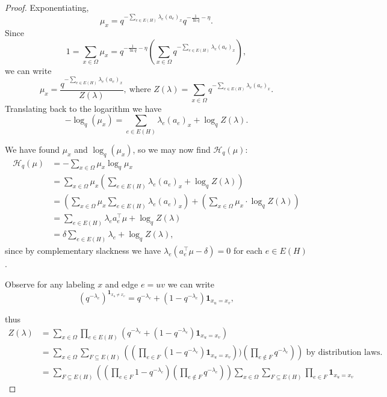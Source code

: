\documentclass[10pt,a4paper]{amsart}
\begin{document}
\begin{proof}
\noindent Exponentiating,
\[
\mu_x=q^{-\sum_{e\in E(H)}\lambda_e(a_e)_x}q^{-\frac{1}{\ln q}-\eta}.
\]
Since 
\[
1=\sum_{x\in\Omega}\mu_x=q^{-\frac{1}{\ln q}-\eta}\left(\sum_{x\in\Omega}q^{-\sum_{e\in E(H)}\lambda_e(a_e)_x}\right),
\]
we can write 
\[
\mu_x=\frac{q^{-\sum_{e\in E(H)}\lambda_e(a_e)_x}}{Z(\lambda)},\ \text{where }Z(\lambda)=\sum_{x\in\Omega}q^{-\sum_{e\in E(H)}\lambda_e(a_e)_x}.
\]
Translating back to the logarithm we have
\[
-\log_q(\mu_x)=\sum_{e\in E(H)}\lambda_e(a_e)_x+\log_qZ(\lambda).
\]

We have found $\mu_x$ and $\log_q(\mu_x)$, so we may now find $\mathcal H_{q}(\mu)$:
\begin{align*}
    \mathcal H_{q}(\mu)&=-\sum_{x\in\Omega}\mu_x\log_q\mu_x\\
    &=\sum_{x\in\Omega}\mu_x\left(\sum_{e\in E(H)}\lambda_e(a_e)_x+\log_qZ(\lambda)\right)\\
    &=\left(\sum_{x\in\Omega}\mu_x\sum_{e\in E(H)}\lambda_e(a_e)_x\right)+\left(\sum_{x\in\Omega}\mu_x\cdot\log_q Z(\lambda)\right)\\
    &=\sum_{e\in E(H)}\lambda_ea_e^\top\mu+\log_qZ(\lambda)\\
    &=\delta\sum_{e\in E(H)}\lambda_e+\log_qZ(\lambda) \tag{1},
    \end{align*}
since by complementary slackness we have $\lambda_e(a_e^\top\mu-\delta)=0$ for each $e\in E(H)$.













Observe for any labeling $x$ and edge $e=uv$ we can write 
\[
(q^{-\lambda_e})^{\mathbf1_{x_u\not=x_v}}=q^{-\lambda_e}+(1-q^{-\lambda_e})\mathbf 1_{x_u=x_v},
\]

thus
\begin{align*}
    Z(\lambda)&=\sum_{x\in\Omega}\prod_{e\in E(H)}(q^{-\lambda_e}+(1-q^{-\lambda_e})\mathbf 1_{x_u=x_v})\\
    &=\sum_{x\in\Omega}\sum_{F\subseteq E(H)}\left((\prod_{e\in F}(1-q^{-\lambda_e})\mathbf 1_{x_u=x_v}))(\prod_{e\not\in F} q^{-\lambda_e})\right)\text{ by distribution laws.}\\
    &=\sum_{F\subseteq E(H)}\left((\prod_{e\in F}1-q^{-\lambda_e})(\prod_{e\not\in F} q^{-\lambda_e})\right)\sum_{x\in\Omega}\sum_{F\subseteq E(H)}\prod_{e\in F}\mathbf 1_{x_u=x_v}
\end{align*}


\end{proof}
\end{document}
